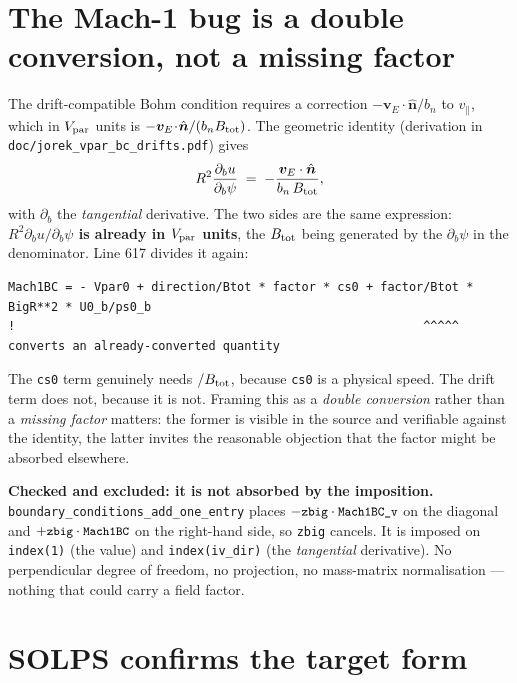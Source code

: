 \documentclass[11pt,a4paper]{article}
\newcommand{\code}[1]{\texttt{\small #1}}
\newcommand{\vE}{\bm v_E}\newcommand{\nhat}{\hat{\bm n}}\newcommand{\that}{\hat{\bm t}}
\begin{document}
\section{The Mach-1 bug is a double conversion, not a missing factor}

The drift-compatible Bohm condition requires a correction $-\vE\!\cdot\!\nhat/b_n$ to
$v_\parallel$, which in $V_{\rm par}$ units is $-\vE\!\cdot\!\nhat/(b_n B_{\rm tot})$. The
geometric identity (derivation in \code{doc/jorek\_vpar\_bc\_drifts.pdf}) gives
\begin{equation}
  R^{2}\frac{\partial_b u}{\partial_b\psi}
  \;=\; -\frac{\vE\cdot\nhat}{b_n\,B_{\rm tot}} ,
  \label{eq:identity}
\end{equation}
with $\partial_b$ the \emph{tangential} derivative. The two sides are the same expression:
\textbf{$R^2\partial_b u/\partial_b\psi$ is already in $V_{\rm par}$ units}, the $B_{\rm tot}$
being generated by the $\partial_b\psi$ in the denominator. Line 617 divides it again:
\begin{lstlisting}
Mach1BC = - Vpar0 + direction/Btot * factor * cs0 + factor/Btot * BigR**2 * U0_b/ps0_b
!                                                         ^^^^^ converts an already-converted quantity
\end{lstlisting}

\begin{keybox}
The \code{cs0} term genuinely needs $/B_{\rm tot}$, because \code{cs0} is a physical speed.
The drift term does not, because it is not. Framing this as a \emph{double conversion}
rather than a \emph{missing factor} matters: the former is visible in the source and
verifiable against the identity, the latter invites the reasonable objection that the factor
might be absorbed elsewhere.
\end{keybox}

\noindent\textbf{Checked and excluded: it is not absorbed by the imposition.}
\code{boundary\_conditions\_add\_one\_entry} places $-\code{zbig}\cdot\code{Mach1BC\_v}$ on
the diagonal and $+\code{zbig}\cdot\code{Mach1BC}$ on the right-hand side, so \code{zbig}
cancels. It is imposed on \code{index(1)} (the value) and \code{index(iv\_dir)} (the
\emph{tangential} derivative). No perpendicular degree of freedom, no projection, no
mass-matrix normalisation --- nothing that could carry a field factor.

\section{SOLPS confirms the target form}
\end{document}
